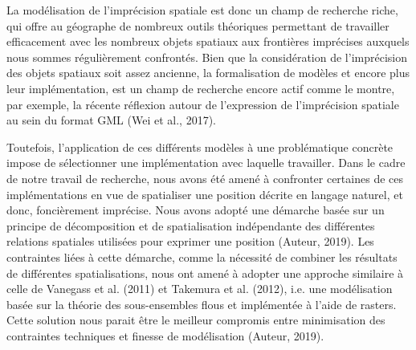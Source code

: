 La modélisation de l’imprécision spatiale est donc un champ de
recherche riche, qui offre au géographe de nombreux outils théoriques
permettant de travailler efficacement avec les nombreux objets
spatiaux aux frontières imprécises auxquels nous sommes régulièrement
confrontés. Bien que la considération de l’imprécision des objets
spatiaux soit assez ancienne, la formalisation de modèles et encore
plus leur implémentation, est un champ de recherche encore actif comme
le montre, par exemple, la récente réflexion autour de l’expression de
l’imprécision spatiale au sein du format GML (Wei et al., 2017).

Toutefois, l’application de ces différents modèles à une problématique
concrète impose de sélectionner une implémentation avec laquelle
travailler. Dans le cadre de notre travail de recherche, nous avons
été amené à confronter certaines de ces implémentations en vue de
spatialiser une position décrite en langage naturel, et donc,
foncièrement imprécise. Nous avons adopté une démarche basée sur un
principe de décomposition et de spatialisation indépendante des
différentes relations spatiales utilisées pour exprimer une position
(Auteur, 2019). Les contraintes liées à cette démarche, comme la
nécessité de combiner les résultats de différentes spatialisations,
nous ont amené à adopter une approche similaire à celle de Vanegass et
al. (2011) et Takemura et al. (2012), i.e. une modélisation basée sur
la théorie des sous-ensembles flous et implémentée à l’aide de
rasters. Cette solution nous parait être le meilleur compromis entre
minimisation des contraintes techniques et finesse de modélisation
(Auteur, 2019).

